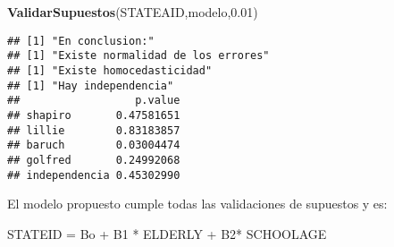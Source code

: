 \documentclass[
]{article}
\newenvironment{Shaded}{\begin{snugshade}}{\end{snugshade}}
\newcommand{\FloatTok}[1]{\textcolor[rgb]{0.00,0.00,0.81}{#1}}
\newcommand{\KeywordTok}[1]{\textcolor[rgb]{0.13,0.29,0.53}{\textbf{#1}}}
\newcommand{\NormalTok}[1]{#1}
\begin{document}
\begin{Shaded}
\begin{Highlighting}[]
\KeywordTok{ValidarSupuestos}\NormalTok{(STATEAID,modelo,}\FloatTok{0.01}\NormalTok{)}
\end{Highlighting}
\end{Shaded}

\begin{verbatim}
## [1] "En conclusion:"
## [1] "Existe normalidad de los errores"
## [1] "Existe homocedasticidad"
## [1] "Hay independencia"
##                  p.value
## shapiro       0.47581651
## lillie        0.83183857
## baruch        0.03004474
## golfred       0.24992068
## independencia 0.45302990
\end{verbatim}

El modelo propuesto cumple todas las validaciones de supuestos y es:

STATEID = Bo + B1 * ELDERLY + B2* SCHOOLAGE
\end{document}
